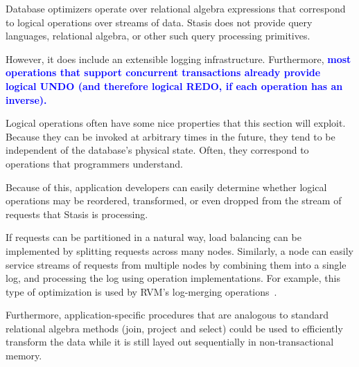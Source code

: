 \documentclass[letterpaper,twocolumn,10pt]{article}
\newcommand{\yad}{Stasis\xspace}
\newcommand{\diff}[1]{\textcolor{blue}{\bf #1}}
\begin{document}
Database optimizers operate over relational algebra expressions that
correspond to logical operations over streams of data.  \yad
does not provide query languages, relational algebra, or other such query processing primitives.  

However, it does include an extensible logging infrastructure.
Furthermore, \diff{most operations that support concurrent transactions already
provide logical UNDO (and therefore logical REDO, if each operation has an
inverse).}

Logical operations often have some nice properties that this section
will exploit.  Because they can be invoked at arbitrary times in the
future, they tend to be independent of the database's physical state.
Often, they correspond to operations that programmers understand.

Because of this, application developers can easily determine whether
logical operations may be reordered, transformed, or even
dropped from the stream of requests that \yad is processing.

If requests can be partitioned in a natural way, load
balancing can be implemented by splitting requests across many nodes.
Similarly, a node can easily service streams of requests from multiple
nodes by combining them into a single log, and processing the log
using operation implementations.  For example, this type of optimization 
is used by RVM's log-merging operations~\cite{lrvm}.

Furthermore, application-specific
procedures that are analogous to standard relational algebra methods
(join, project and select) could be used to efficiently transform the data
while it is still layed out sequentially
in non-transactional memory.

\end{document}
